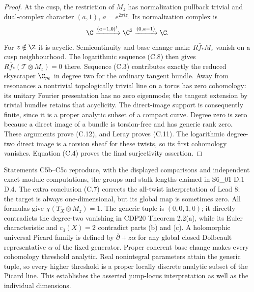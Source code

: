 \begin{proof}
At the cusp, the restriction of $M_z$ has normalization pullback trivial and dual-complex character $(a,1)$, $a=e^{2\pi iz}$. Its normalization complex is
\[
 \C\xrightarrow{(a-1,0)^t}\C^2
 \xrightarrow{(0,a-1)}\C.
\]
For $z\notin\Z$ it is acyclic. Semicontinuity and base change make $R\bar f_*M_z$ vanish on a cusp neighbourhood. The logarithmic sequence (C.8) then gives $R\bar f_*(\mathcal T\otimes M_z)=0$ there. Sequence (C.3) contributes exactly the reduced skyscraper $\C_{p_0}$ in degree two for the ordinary tangent bundle. Away from resonances a nontrivial topologically trivial line on a torus has zero cohomology: its unitary Fourier presentation has no zero eigenmode; the tangent extension by trivial bundles retains that acyclicity. The direct-image support is consequently finite, since it is a proper analytic subset of a compact curve. Degree zero is zero because a direct image of a bundle is torsion-free and has generic rank zero. These arguments prove (C.12), and Leray proves (C.11). The logarithmic degree-two direct image is a torsion sheaf for these twists, so its first cohomology vanishes. Equation (C.4) proves the final surjectivity assertion.
\end{proof}

Statements C5b--C5c reproduce, with the displayed comparisons and independent exact module computations, the groups and stalk lengths claimed in S6\_01 D.1--D.4. The extra conclusion (C.7) corrects the all-twist interpretation of Lead 8: the target is always one-dimensional, but its global map is sometimes zero. All formulas give $\chi(T_X\otimes M_z)=1$. The generic tuple is $(0,0,1,0)$; it directly contradicts the degree-two vanishing in CDP20 Theorem 2.2(a), while its Euler characteristic and $c_3(X)=2$ contradict parts (b) and (c). A holomorphic universal Picard family is defined by $\bar\partial+z\alpha$ for any global closed Dolbeault representative $\alpha$ of the fixed generator. Proper coherent base change makes every cohomology threshold analytic. Real nonintegral parameters attain the generic tuple, so every higher threshold is a proper locally discrete analytic subset of the Picard line. This establishes the asserted jump-locus interpretation as well as the individual dimensions.
